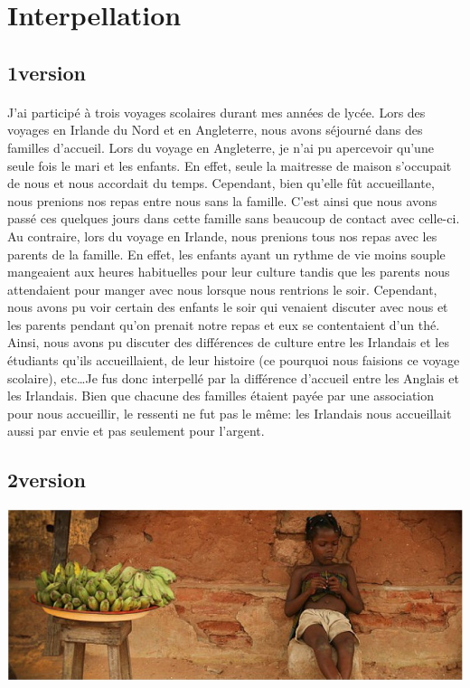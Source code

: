 \section{Interpellation}
\subsection{1\iere version}

\paragraph{} J'ai participé à trois voyages scolaires durant mes années de
lycée.  Lors des voyages en Irlande du Nord et en Angleterre, nous avons
séjourné dans des familles d'accueil. Lors du voyage en Angleterre, je n'ai pu
apercevoir qu'une seule fois le mari et les enfants. En effet, seule la
maitresse de maison s'occupait de nous et nous accordait du temps. Cependant,
bien qu'elle fût accueillante, nous prenions nos repas entre nous sans la
famille. C'est ainsi que nous avons passé ces quelques jours dans cette famille
sans beaucoup de contact avec celle-ci. Au contraire, lors du voyage en
Irlande, nous prenions tous nos repas avec les parents de la famille. En effet,
les enfants ayant un rythme de vie moins souple mangeaient aux heures
habituelles pour leur culture tandis que les parents nous attendaient pour
manger avec nous lorsque nous rentrions le soir. Cependant, nous avons pu voir
certain des enfants le soir qui venaient discuter avec nous et les parents
pendant qu'on prenait notre repas et eux se contentaient d'un thé. Ainsi, nous
avons pu discuter des différences de culture entre les Irlandais et les
étudiants qu'ils accueillaient, de leur histoire (ce pourquoi nous faisions ce
voyage scolaire), etc\ldots Je fus donc interpellé par la différence d'accueil
entre les Anglais et les Irlandais. Bien que chacune des familles étaient payée
par une association pour nous accueillir, le ressenti ne fut pas le même: les
Irlandais nous accueillait aussi par envie et pas seulement pour l'argent.

\subsection{2\ieme version}

\begin{center}
	\includegraphics[scale=0.7]{Afrique.jpg}
\end{center}

